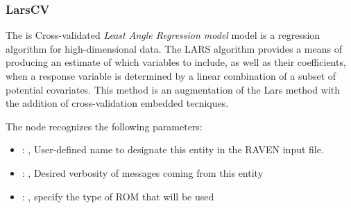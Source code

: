 \subsubsection{LarsCV}
  The  is Cross-validated \textit{Least Angle Regression model} model
  is a regression algorithm for high-dimensional data.                         The LARS algorithm
  provides a means of producing an estimate of which variables                         to include,
  as well as their coefficients, when a response variable is                         determined by a
  linear combination of a subset of potential covariates.                         This method is an
  augmentation of the Lars method with the addition of cross-validation
  embedded tecniques.                         

  The  node recognizes the following parameters:
    \begin{itemize}
      \item {}: , 
        User-defined name to designate this entity in the RAVEN input file.
      \item {}: , 
        Desired verbosity of messages coming from this entity
      \item {}: , 
        specify the type of ROM that will be used
  \end{itemize}


